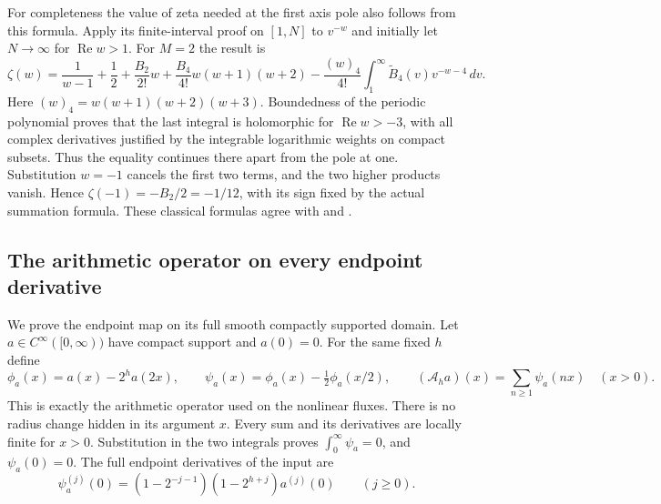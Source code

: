 For completeness the value of zeta needed at the first axis pole
also follows from this formula. Apply its finite-interval proof
on $[1,N]$ to $v^{-w}$ and initially let $N\to\infty$
for $\operatorname{Re}w>1$. For $M=2$ the result is
\[
 \zeta(w)=\frac1{w-1}+\frac12
    +\frac{B_2}{2!}w+\frac{B_4}{4!}w(w+1)(w+2)
    -\frac{(w)_4}{4!}\int_1^\infty
                     \widetilde B_4(v)v^{-w-4}\,dv.
\]
Here $(w)_4=w(w+1)(w+2)(w+3)$.
Boundedness of the periodic polynomial proves that the last
integral is holomorphic for $\operatorname{Re}w>-3$, with
all complex derivatives justified by the integrable logarithmic
weights on compact subsets. Thus the equality continues there
apart from the pole at one. Substitution $w=-1$ cancels the
first two terms, and the two higher products vanish. Hence
$\zeta(-1)=-B_2/2=-1/12$, with its sign fixed by the actual
summation formula. These classical formulas agree with
\cite[\S2.10(i)]{cqDLMFEM} and \cite[\S25.6(i)]{cqDLMFZeta}.


\subsection{The arithmetic operator on every endpoint derivative}

We prove the endpoint map on its full smooth compactly supported
domain. Let \(a\in C^\infty([0,\infty))\) have compact support and
\(a(0)=0\). For the same fixed \(h\) define
\[
 \phi_a(x)=a(x)-2^h a(2x),\qquad
 \psi_a(x)=\phi_a(x)-\tfrac12\phi_a(x/2),\qquad
 (\mathcal A_h a)(x)=\sum_{n\ge1}\psi_a(nx)\quad(x>0).
\]
This is exactly the arithmetic operator used on the nonlinear fluxes.
There is no radius change hidden in its argument \(x\).
Every sum and its derivatives are locally finite for \(x>0\).
Substitution in the two integrals proves
\(\int_0^\infty\psi_a=0\), and \(\psi_a(0)=0\).
The full endpoint derivatives of the input are
\begin{equation}\label{eq:cq-naj:psi-jet}
 \psi_a^{(j)}(0)
  =(1-2^{-j-1})(1-2^{h+j})a^{(j)}(0)\qquad(j\ge0).
\end{equation}

